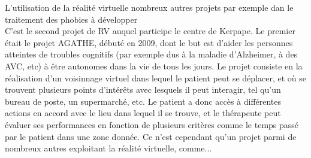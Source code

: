 L'utilisation de la réalité virtuelle nombreux autres projets par exemple dan le traitement des phobies à développer \\

C'est le second projet de RV auquel participe le centre de Kerpape. Le premier était le projet AGATHE, débuté en 2009, dont le but est d'aider les personnes atteintes de troubles cognitifs (par exemple dus à la maladie d'Alzheimer, à des AVC, etc) à être autonomes dans la vie de tous les jours. Le projet consiste en la réalisation d'un \og voisinnage virtuel \fg{} dans lequel le patient peut se déplacer, et où se trouvent plusieurs points d'intérêts avec lesquels il peut interagir, tel qu'un bureau de poste, un supermarché, etc. Le patient a donc accès à différentes actions en accord avec le lieu dans lequel il se trouve, et le thérapeute peut évaluer ses performances en fonction de plusieurs critères comme le temps passé par le patient dans une zone donnée. 
Ce n'est cependant qu'un projet parmi de nombreux autres exploitant la réalité virtuelle, comme...